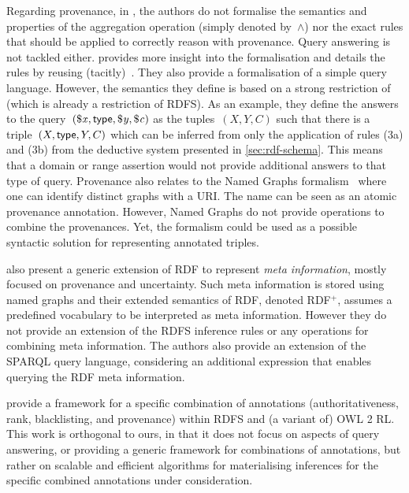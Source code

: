 Regarding provenance, in \citet{DelbruPolleresTummarello:2008aa}, the authors do not formalise the semantics and
properties of the aggregation operation (simply denoted by~$\land$) nor the exact rules that should be applied to
correctly reason with provenance. Query answering is not tackled either.
%
\citet{FlourisFundulakiPediaditis:2009aa} provides more insight into the formalisation and details the rules by reusing
(tacitly)~\citet{MunozPerezGutierrez:2007aa}. They also provide a formalisation of a simple query language. However, the
semantics they define is based on a strong restriction of \rhodf (which is already a restriction of \ac{RDFS}).
%
As an example, they define the answers to the query~$(\$\mathit{x}, \mathsf{type}, \$\mathit{y}, \$\mathit{c})$ as the tuples~$(X,Y,C)$ such
that there is a triple~$(X, \mathsf{type}, Y, C)$ which can be inferred from only the application of rules (3a) and (3b) from
the deductive system presented in \cref{sec:rdf-schema}.
%
This means that a domain or range assertion would not provide additional answers to that type of query.
%
Provenance also relates to the Named Graphs formalism~\cite{CarrollBizerHayes:2005aa} where one can identify distinct
graphs with a URI. The name can be seen as an atomic provenance annotation. However, Named Graphs do not provide
operations to combine the provenances. Yet, the formalism could be used as a possible syntactic solution for
representing annotated triples.


\citet{DividinoSizovStaab:2009aa} also present a generic extension of RDF to represent \emph{meta information}, mostly
focused on provenance and uncertainty.  Such meta information is stored using named graphs and their extended semantics
of RDF, denoted RDF$^+$, assumes a predefined vocabulary to be interpreted as meta information.  However they do not
provide an extension of the \ac{RDFS} inference rules or any operations for combining meta information.  The authors
also provide an extension of the SPARQL query language, considering an additional expression that enables querying the
RDF meta information.


\citet{BonattiHoganPolleres:2011aa} provide a framework for a specific combination of annotations (authoritativeness,
rank, blacklisting, and provenance) within \ac{RDFS} and (a variant of) \ac{OWL} 2 RL. This work is orthogonal to ours,
in that it does not focus on aspects of query answering, or providing a generic framework for combinations of
annotations, but rather on scalable and efficient algorithms for materialising inferences for the specific combined
annotations under consideration.




